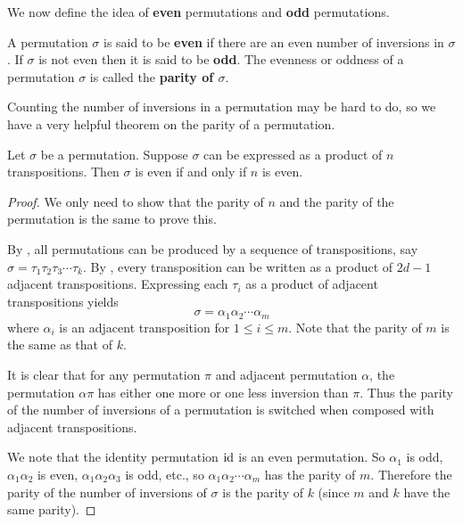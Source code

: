 We now define the idea of \textbf{even} permutations and \textbf{odd} permutations.
\begin{definition}
    A permutation $\sigma$ is said to be \textbf{even} if there are an even number of inversions in $\sigma$. If $\sigma$ is not even then it is said to be \textbf{odd}. The evenness or oddness of a permutation $\sigma$ is called the \textbf{parity of $\sigma$}.
\end{definition}

Counting the number of inversions in a permutation may be hard to do, so we have a very helpful theorem on the parity of a permutation.

\begin{theorem}\label{thrm-parity-of-permutation}
    Let $\sigma$ be a permutation. Suppose $\sigma$ can be expressed as a product of $n$ transpositions. Then $\sigma$ is even if and only if $n$ is even.
\end{theorem}
\begin{proof}
    We only need to show that the parity of $n$ and the parity of the permutation is the same to prove this.

    By , all permutations can be produced by a sequence of transpositions, say $\sigma = \tau_1\tau_2\tau_3\cdots\tau_k$. By , every transposition can be written as a product of $2d - 1$ adjacent transpositions. Expressing each $\tau_i$ as a product of adjacent transpositions yields
    \[
        \sigma = \alpha_1\alpha_2\cdots\alpha_m
    \]
    where $\alpha_i$ is an adjacent transposition for $1 \leq i \leq m$. Note that the parity of $m$ is the same as that of $k$.

    It is clear that for any permutation $\pi$ and adjacent permutation $\alpha$, the permutation $\alpha\pi$ has either one more or one less inversion than $\pi$. Thus the parity of the number of inversions of a permutation is switched when composed with adjacent transpositions.

    We note that the identity permutation $\mathrm{id}$ is an even permutation. So $\alpha_1$ is odd, $\alpha_1\alpha_2$ is even, $\alpha_1\alpha_2\alpha_3$ is odd, etc., so $\alpha_1\alpha_2\cdots\alpha_m$ has the parity of $m$. Therefore the parity of the number of inversions of $\sigma$ is the parity of $k$ (since $m$ and $k$ have the same parity).
\end{proof}

